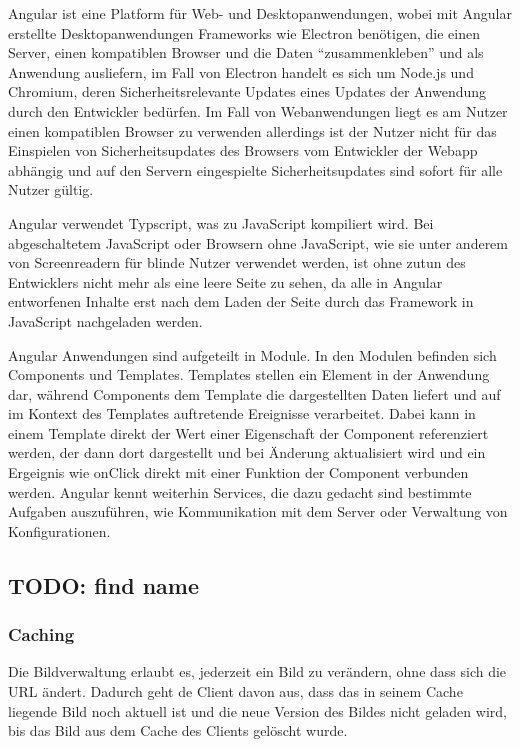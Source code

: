 Angular ist eine Platform für Web- und Desktopanwendungen, wobei mit Angular
erstellte Desktopanwendungen Frameworks wie Electron benötigen, die einen
Server, einen kompatiblen Browser und die Daten ``zusammenkleben'' und als
Anwendung ausliefern, im Fall von Electron handelt es sich um Node.js und
Chromium, deren Sicherheitsrelevante Updates eines Updates der Anwendung durch
den Entwickler bedürfen. Im Fall von Webanwendungen liegt es am Nutzer einen
kompatiblen Browser zu verwenden allerdings ist der Nutzer nicht für das
Einspielen von Sicherheitsupdates des Browsers vom Entwickler der Webapp
abhängig und auf den Servern eingespielte Sicherheitsupdates sind sofort für
alle Nutzer gültig.

Angular verwendet Typscript, was zu JavaScript kompiliert wird. Bei
abgeschaltetem JavaScript oder Browsern ohne JavaScript, wie sie unter anderem
von Screenreadern für blinde Nutzer verwendet werden, ist ohne zutun des
Entwicklers nicht mehr als eine leere Seite zu sehen, da alle in Angular
entworfenen Inhalte erst nach dem Laden der Seite durch das Framework in
JavaScript nachgeladen werden.

Angular Anwendungen sind aufgeteilt in Module. In den Modulen befinden sich
Components und Templates. Templates stellen ein Element in der Anwendung dar,
während Components dem Template die dargestellten Daten liefert und auf im
Kontext des Templates auftretende Ereignisse verarbeitet. Dabei kann in einem
Template direkt der Wert einer Eigenschaft der Component referenziert werden,
der dann dort dargestellt und bei Änderung aktualisiert wird und ein Ergeignis
wie onClick direkt mit einer Funktion der Component verbunden werden. Angular
kennt weiterhin Services, die dazu gedacht sind bestimmte Aufgaben auszuführen,
wie Kommunikation mit dem Server oder Verwaltung von Konfigurationen.

\subsection{TODO: find name}


\subsubsection{Caching}

Die Bildverwaltung erlaubt es, jederzeit ein Bild zu verändern, ohne dass sich
die URL ändert. Dadurch geht de Client davon aus, dass das in seinem Cache
liegende Bild noch aktuell ist und die neue Version des Bildes nicht geladen
wird, bis das Bild aus dem Cache des Clients gelöscht wurde.

